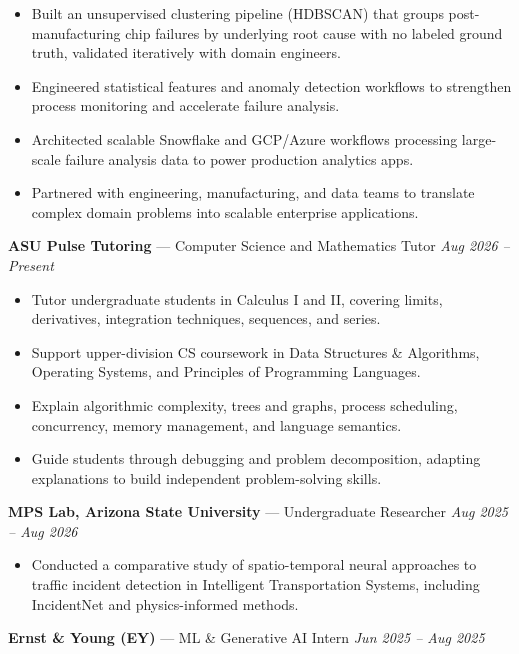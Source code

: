 \documentclass[a4paper,8pt]{extarticle}
\begin{document}
\begin{itemize}
\item Built an unsupervised clustering pipeline (HDBSCAN) that groups post-manufacturing chip failures by underlying root cause with no labeled ground truth, validated iteratively with domain engineers.
\item Engineered statistical features and anomaly detection workflows to strengthen process monitoring and accelerate failure analysis.
\item Architected scalable Snowflake and GCP/Azure workflows processing large-scale failure analysis data to power production analytics apps.
\item Partnered with engineering, manufacturing, and data teams to translate complex domain problems into scalable enterprise applications.
\end{itemize}

\noindent
\textbf{ASU Pulse Tutoring} --- Computer Science and Mathematics Tutor
\hfill \textit{Aug 2026 -- Present}

\begin{itemize}
\item Tutor undergraduate students in Calculus I and II, covering limits, derivatives, integration techniques, sequences, and series.
\item Support upper-division CS coursework in Data Structures \& Algorithms, Operating Systems, and Principles of Programming Languages.
\item Explain algorithmic complexity, trees and graphs, process scheduling, concurrency, memory management, and language semantics.
\item Guide students through debugging and problem decomposition, adapting explanations to build independent problem-solving skills.
\end{itemize}

\noindent
\textbf{MPS Lab, Arizona State University} --- Undergraduate Researcher
\hfill \textit{Aug 2025 -- Aug 2026}

\begin{itemize}
\item Conducted a comparative study of spatio-temporal neural approaches to traffic incident detection in Intelligent Transportation Systems, including IncidentNet and physics-informed methods.
\end{itemize}

\noindent
\textbf{Ernst \& Young (EY)} --- ML \& Generative AI Intern
\hfill \textit{Jun 2025 -- Aug 2025}
\end{document}

